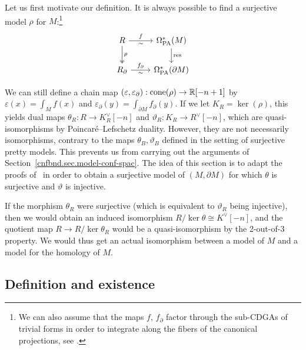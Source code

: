 Let us first motivate our definition.
It is always possible to find a surjective model $\rho$ for $M$:\footnote{We can also assume that the maps $f$, $f_{\partial}$ factor through the sub-CDGAs of trivial forms in order to integrate along the fibers of the canonical projections, see \cite[Appendix~C]{CamposWillwacher2016}.}
\begin{equation}
  \label{cnfbnd.eq.surj-mod-rho}
  \begin{tikzcd}
    R \ar[d, two heads, "\rho"] \ar[r, "f", "\sim" swap] & \OmPA^{*}(M) \ar[d, "\operatorname{res}"] \\
    R_{\partial} \ar[r, "f_{\partial}", "\sim" swap] & \OmPA^{*}(\partial M)
  \end{tikzcd}
\end{equation}

We can still define a chain map $(\varepsilon, \varepsilon_{\partial}) : \operatorname{cone}(\rho) \to \mathbb{R}[-n+1]$ by $\varepsilon(x) = \int_{M} f(x)$ and $\varepsilon_{\partial}(y) = \int_{\partial M} f_{\partial}(y)$.
If we let $K_{R} = \ker(\rho)$, this yields dual maps $\theta_{R} : R \to K_{R}^{\vee}[-n]$ and $\vartheta_{R} : K_{R} \to R^{\vee}[-n]$, which are quasi-isomorphisms by Poincaré--Lefschetz duality.
However, they are not necessarily isomorphisms, contrary to the maps $\theta_{B}, \vartheta_{B}$ defined in the setting of surjective pretty models.
This prevents us from carrying out the arguments of Section~\ref{cnfbnd.sec.model-conf-spac}.
The idea of this section is to adapt the proofs of~\cite{LambrechtsStanley2008} in order to obtain a surjective model of $(M, \partial M)$ for which $\theta$ is surjective and $\vartheta$ is injective.

If the morphism $\theta_{R}$ were surjective (which is equivalent to $\vartheta_{R}$ being injective), then we would obtain an induced isomorphism $R / \ker \theta \cong K^{\vee}[-n]$, and the quotient map $R \to R / \ker \theta_{R}$ would be a quasi-isomorphism by the 2-out-of-3 property.
We would thus get an actual isomorphism between a model of $M$ and a model for the homology of $M$.

\subsection{Definition and existence}
\label{cnfbnd.sec.definition}

